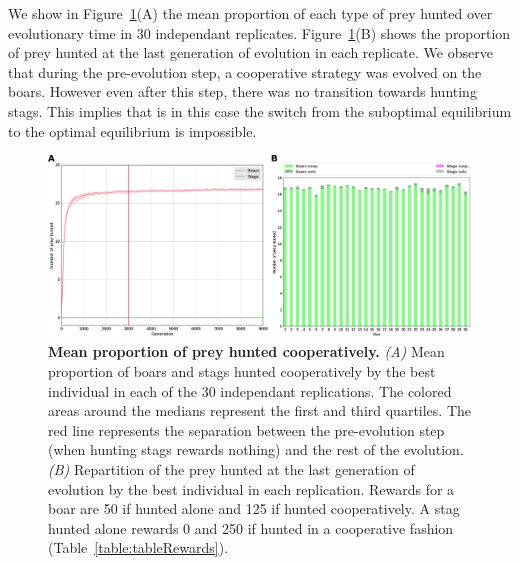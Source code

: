     We show in Figure~\ref{fig:figControl}(A) the mean proportion of each type of prey hunted over evolutionary time in $30$ independant replicates. Figure~\ref{fig:figControl}(B) shows the proportion of prey hunted at the last generation of evolution in each replicate. We observe that during the pre-evolution step, a cooperative strategy was evolved on the boars. However even after this step, there was no transition towards hunting stags. This implies that is in this case the switch from the suboptimal equilibrium to the optimal equilibrium is impossible. 


    \begin{figure}[h]
      \centering
        \includegraphics[width=1\linewidth]{fig/ArticleBio2/Fig1.png}
        \caption{\textbf{Mean proportion of prey hunted cooperatively.}
        \emph{(A)} Mean proportion of boars and stags hunted cooperatively by the best individual in each of the $30$ independant replications. The colored areas around the medians represent the first and third quartiles. The red line represents the separation between the pre-evolution step (when hunting stags rewards nothing) and the rest of the evolution. \emph{(B)} Repartition of the prey hunted at the last generation of evolution by the best individual in each replication. Rewards for a boar are 50 if hunted alone and 125 if hunted cooperatively. A stag hunted alone rewards 0 and 250 if hunted in a cooperative fashion (Table~\ref{table:tableRewards}).}
      \label{fig:figControl}
    \end{figure}

